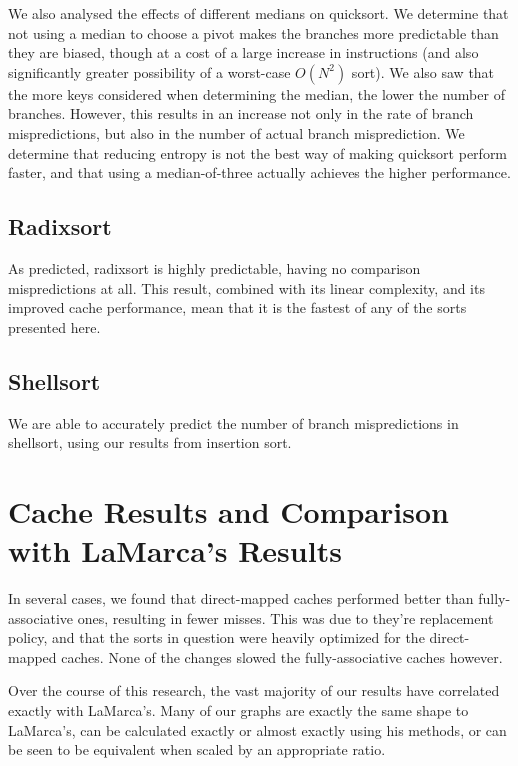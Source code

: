 We also analysed the effects of different medians on quicksort. We determine that
not using a median to choose a pivot makes the branches more predictable than
they are biased, though at a cost of a large increase in instructions (and also
significantly greater possibility of a worst-case $O(N^2)$ sort). We also saw
that the more keys considered when determining the median, the lower the number
of branches. However, this results in an increase not only in the rate of branch
mispredictions, but also in the number of actual branch misprediction. We
determine that reducing entropy is not the best way of making quicksort perform
faster, and that using a median-of-three actually achieves the higher
performance.


\subsection{Radixsort}

As predicted, radixsort is highly predictable, having no comparison
mispredictions at all. This result, combined with its linear complexity, and its
improved cache performance, mean that it is the fastest of any of the sorts
presented here.


\subsection{Shellsort}

We are able to accurately predict the number of branch mispredictions in
shellsort, using our results from insertion sort. 

\section{Cache Results and Comparison with LaMarca's Results}

In several cases, we found that direct-mapped caches performed better than
fully-associative ones, resulting in fewer misses. This was due to they're
replacement policy, and that the sorts in question were heavily optimized for
the direct-mapped caches. None of the changes slowed the fully-associative
caches however.

Over the course of this research, the vast majority of our results have
correlated exactly with LaMarca's. Many of our graphs are exactly the same
shape to LaMarca's, can be calculated exactly or almost exactly using his
methods, or can be seen to be equivalent when scaled by an appropriate ratio.


